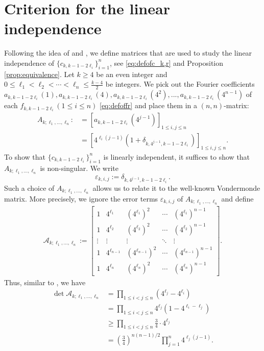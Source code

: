 \documentclass[11pt,letterpaper,reqno]{amsart}
\numberwithin{figure}{section}
\numberwithin{table}{section}
\theoremstyle{definition}
\theoremstyle{plain}
\theoremstyle{definition}
\theoremstyle{definition}
\theoremstyle{remark}
\numberwithin{equation}{section}
\theoremstyle{remark}
\begin{document}
\section{Criterion for the linear independence}\label{sect:matrix}
Following the idea of \cite{oddperiods} and \cite{evenperiods}, we define matrices that are used to study the linear independence of $\{c_{k,k-1-2\ell_i}\}_{i=1}^n$, see \eqref{eq:defofc_k,r} and Proposition \ref{prop:equivalence}. Let $k\geq4$ be an even integer and $0\leq\ell_1<\ell_2<\cdots<\ell_n\leq\frac{k-4}{2}$ be integers. We pick out the Fourier coefficients $a_{k,k-1-2\ell_i}(1), a_{k,k-1-2\ell_i}(4), a_{k,k-1-2\ell_i}(4^2),...,a_{k,k-1-2\ell_i}(4^{n-1})$ of each $f_{k,k-1-2\ell_i}(1\leq i\leq n)$  \eqref{eq:defoffr} and place them in a $(n,n)$-matrix:
\begin{align}
    A_{k;\ell_1,...,\ell_n}:&=\left[a_{k,k-1-2\ell_i}(4^{j-1})\right]_{1\leq i,j\leq n}\\&=\left[4^{\ell_i(j-1)}(1+\delta_{k,4^{j-1},k-1-2\ell_i})\right]_{1\leq i,j\leq n} .\label{eq:defofmatrix}
\end{align}
To show that $\{c_{k,k-1-2\ell_i}\}_{i=1}^n$ is linearly independent, it suffices to show that $A_{k;\ell_1,...,\ell_n}$ is non-singular.
We write $$\varepsilon_{k,i,j}:=\delta_{k,4^{j-1},k-1-2\ell_i}.$$
Such a choice of $A_{k;\ell_1,...,\ell_n}$ allows us to relate it to the well-known Vondermonde matrix. More precisely, we ignore the error terms $\varepsilon_{k,i,j}$ of $A_{k;\ell_1,...,\ell_n}$  and define
\begin{align}
\mathscr{A}_{k;\ell_1,...,\ell_n}:=\begin{bmatrix}
        1 & 4^{\ell_1} & (4^{\ell_1})^2 & \cdots & (4^{\ell_1})^{n-1}\\
        1 & 4^{\ell_2} & (4^{\ell_2})^2 & \cdots & (4^{\ell_2})^{n-1}\\
        \vdots & \vdots & \vdots & \ddots & \vdots\\
        1 & 4^{\ell_{n-1}} & (4^{\ell_{n-1}})^2 & \cdots & (4^{\ell_{n-1}})^{n-1}\\ 
        1 & 4^{\ell_n} & (4^{\ell_n})^2 & \cdots & (4^{\ell_n})^{n-1}
    \end{bmatrix}.
\end{align}
Thus, similar to \cite[(2.8)]{oddperiods}, we have
\begin{align}
    \det\mathscr{A}_{k;\ell_1,...,\ell_n}&=\prod_{1\leq i<j\leq n}(4^{\ell_j}-4^{\ell_i})\\&=\prod_{1\leq i<j\leq n}4^{\ell_j}(1-4^{\ell_i-\ell_j})\\&\geq\prod_{1\leq i<j\leq n}\frac{3}{4} \cdot 4^{\ell_j}\\&=\left(\frac{3}{4}\right)^{n(n-1)/2}\prod_{j=1}^n4^{\ell_j(j-1)}.\label{eq:lowerboundofvandermondedet}
\end{align}
\end{document}
